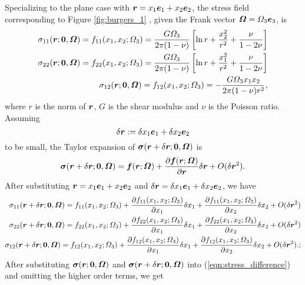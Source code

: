\documentclass[11pt,letterpaper]{article}
\begin{document}
Specializing to the plane case with $\bfr = x_1\bfe_1+x_2\bfe_2$, the stress field corresponding to Figure \ref{fig:burgers_1} , given the Frank vector $\bfOmega=\Omega_3 \bfe_3$, is  
\begin{eqnarray*}
\sigma_{11}(\bfr;\textbf{0}, \bfOmega)  = f_{11}(x_1,x_2; \Omega_3) = \frac{G\Omega_3}{2\pi(1-\nu)}\left[ \ln r + \frac{x_2^2}{r^2}+\frac{\nu}{1-2\nu}\right] \\
\sigma_{22}(\bfr;\textbf{0}, \bfOmega)  = f_{22}(x_1,x_2; \Omega_3) = \frac{G\Omega_3}{2\pi(1-\nu)}\left[\ln r + \frac{x_1^2}{r^2}+\frac{\nu}{1-2\nu}\right] \\
\sigma_{12}(\bfr;\textbf{0}, \bfOmega)  = f_{12}(x_1,x_2; \Omega_3) = -\frac{G\Omega_3x_1x_2}{2\pi(1-\nu)r^2},
\end{eqnarray*}
where $r$ is the norm of $\bfr$, $G$ is the shear modulus and $\nu$ is the Poisson ratio. Assuming
\begin{equation}\label{sep_vec}
\delta \bfr := \delta x_1 \bfe_1 + \delta x_2 \bfe_2
\end{equation}
to be small, the Taylor expansion of $\bfsigma(\bfr+\delta\bfr; \textbf{0}, \bfOmega)$ is
\begin{equation*}
\bfsigma(\bfr+\delta\bfr; \textbf{0}, \bfOmega) = \bff(\bfr; \bfOmega) + \frac{\partial \bff(\bfr; \bfOmega)}{\partial \bfr} \delta \bfr + O(\delta\bfr^2).
\end{equation*}
After substituting $\bfr= x_1\bfe_1+x_2\bfe_2$ and $\delta \bfr = \delta x_1 \bfe_1 + \delta x_2 \bfe_2$, we have
\begin{eqnarray*}
\sigma_{11}(\bfr+\delta\bfr; \textbf{0}, \bfOmega) = f_{11}(x_1,x_2;\Omega_3) + \frac{\partial f_{11}(x_1,x_2;\Omega_3)}{\partial x_1} \delta x_1 + \frac{\partial  f_{11}(x_1,x_2;\Omega_3)}{\partial x_2} \delta x_2 + O(\delta\bfr^2) \\
\sigma_{22}(\bfr+\delta\bfr; \textbf{0}, \bfOmega) = f_{22}(x_1,x_2;\Omega_3) + \frac{\partial f_{22}(x_1,x_2;\Omega_3)}{\partial x_1} \delta x_1 + \frac{\partial  f_{22}(x_1,x_2;\Omega_3)}{\partial x_2} \delta x_2 + O(\delta\bfr^2) \\
\sigma_{12}(\bfr+\delta\bfr; \textbf{0}, \bfOmega) = f_{12}(x_1,x_2;\Omega_3) + \frac{\partial f_{12}(x_1,x_2;\Omega_3)}{\partial x_1} \delta x_1 + \frac{\partial  f_{12}(x_1,x_2;\Omega_3)}{\partial x_2} \delta x_2 + O(\delta\bfr^2).;
\end{eqnarray*}
After substituting $\bfsigma(\bfr;\textbf{0},\bfOmega)$ and $\bfsigma(\bfr+\delta\bfr;\textbf{0},\bfOmega)$ into  (\ref{eqn:stress_difference}) and omitting the higher order terms, we get
\end{document}
